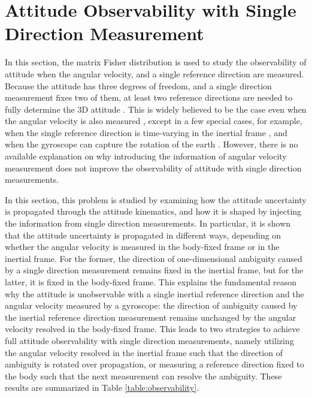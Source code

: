 \section{Attitude Observability with Single Direction Measurement} \label{section:observability}

In this section, the matrix Fisher distribution is used to study the observability of attitude when the angular velocity, and a single reference direction are measured.
Because the attitude has three degrees of freedom, and a single direction measurement fixes two of them, at least two reference directions are needed to fully determine the 3D attitude \cite{markley1988attitude,shuster1981three}.
This is widely believed to be the case even when the angular velocity is also measured \cite{mahony2008nonlinear}, except in a few special cases, for example, when the single reference direction is time-varying in the inertial frame \cite{batista2012ges,grip2011attitude,lee2007global}, and when the gyroscope can capture the rotation of the earth \cite{reis2018nonlinear}.
However, there is no available explanation on why introducing the information of angular velocity measurement does not improve the observability of attitude with single direction measurements.

In this section, this problem is studied by examining how the attitude uncertainty is propagated through the attitude kinematics, and how it is shaped by injecting the information from single direction measurements.
In particular, it is shown that the attitude uncertainty is propagated in different ways, depending on whether the angular velocity is measured in the body-fixed frame or in the inertial frame.
For the former, the direction of one-dimensional ambiguity caused by a single direction measurement remains fixed in the inertial frame, but for the latter, it is fixed in the body-fixed frame.
This explains the fundamental reason why the attitude is unobservable with a single inertial reference direction and the angular velocity measured by a gyroscope: the direction of ambiguity caused by the inertial reference direction measurement remains unchanged by the angular velocity resolved in the body-fixed frame.
This leads to two strategies to achieve full attitude observability with single direction measurements, namely utilizing the angular velocity resolved in the inertial frame such that the direction of ambiguity is rotated over propagation, or measuring a reference direction fixed to the body such that the next measurement can resolve the ambiguity.
These results are summarized in Table \ref{table:observability}.

